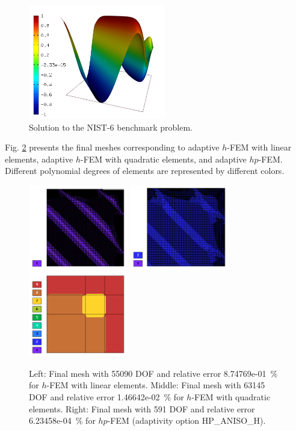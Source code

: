 \documentclass[12pt]{elsarticle}
\begin{document}
\begin{figure}[H]
\centering
\vspace{-3mm}
\includegraphics[height=5cm]{nist/nist-6/solution.png}
\caption{Solution to the NIST-6 benchmark problem.}
\vspace{-3mm}
\label{fig:sln-nist06}
\end{figure}

Fig. \ref{fig:nist-6-hp-aniso} presents the final meshes corresponding to adaptive $h$-FEM with 
linear elements, adaptive $h$-FEM with quadratic elements, and adaptive $hp$-FEM. Different 
polynomial degrees of elements are represented by different colors. 

\begin{figure}[H]
\centering
\includegraphics[height=3.7cm]{nist/nist-6/mesh_h1_aniso.png}
\includegraphics[height=3.7cm]{nist/nist-6/mesh_h2_aniso.png}
\includegraphics[height=3.7cm]{nist/nist-6/mesh_hp_aniso.png}
\vspace{-3mm}
\caption{
Left: Final mesh with 55090 DOF and relative error 8.74769e-01~\% for $h$-FEM with linear elements.
Middle: Final mesh with 63145 DOF and relative error 1.46642e-02~\% for $h$-FEM with quadratic elements. 
Right: Final mesh with 591 DOF and relative error 6.23458e-04~\% for $hp$-FEM (adaptivity option HP\_ANISO\_H).}
\vspace{-2mm}
\label{fig:nist-6-hp-aniso}
\end{figure}
\end{document}
